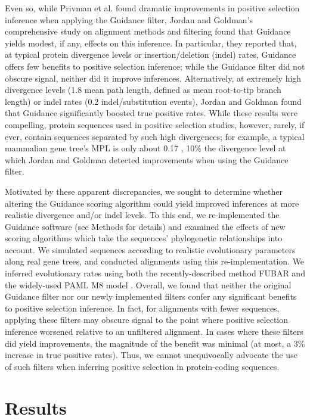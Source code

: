 \documentclass[10pt]{article}
\begin{document}
Even so, while Privman et al. \citep{Privman2012} found dramatic improvements in positive selection inference when applying the Guidance filter, Jordan and Goldman's \citep{Jordan2011} comprehensive study on alignment methods and filtering found that Guidance yields modest, if any, effects on this inference. In particular, they reported that, at typical protein divergence levels or insertion/deletion (indel) rates, Guidance offers few benefits to positive selection inference; while the Guidance filter did not obscure signal, neither did it improve inferences. Alternatively, at extremely high divergence levels (1.8 mean path length, defined as mean root-to-tip branch length) or indel rates (0.2 indel/substitution events), Jordan and Goldman found that Guidance significantly boosted true positive rates. While these results were compelling, protein sequences used in positive selection studies, however, rarely, if ever, contain sequences separated by such high divergences; for example, a typical mammalian gene tree's MPL is only about 0.17 \citep{Spielman2013}, 10\% the divergence level at which Jordan and Goldman detected improvements when using the Guidance filter.

Motivated by these apparent discrepancies, we sought to determine whether altering the Guidance scoring algorithm could yield improved inferences at more realistic divergence and/or indel levels. To this end, we re-implemented the Guidance software (see Methods for details) and examined the effects of new scoring algorithms which take the sequences' phylogenetic relationships into account. We simulated sequences according to realistic evolutionary parameters along real gene trees, and conducted alignments using this re-implementation. We inferred evolutionary rates using both the recently-described method FUBAR \citep{Murrell2013} and the widely-used PAML M8 model \citep{Yang2007}. Overall, we found that neither the original Guidance filter nor our newly implemented filters confer any significant benefits to positive selection inference. In fact, for alignments with fewer sequences, applying these filters may obscure signal to the point where positive selection inference worsened relative to an unfiltered alignment. In cases where these filters did yield improvements, the magnitude of the benefit was minimal (at most, a 3\% increase in true positive rates). Thus, we cannot unequivocally advocate the use of such filters when inferring positive selection in protein-coding sequences.


\section*{Results}
\end{document}
